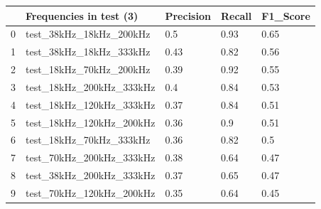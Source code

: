 \begin{longtable}{lllll}
\hline
\multicolumn{1}{|l|}{} & \multicolumn{1}{l|}{Frequencies in test (3)} & \multicolumn{1}{l|}{Precision} & \multicolumn{1}{l|}{Recall} & \multicolumn{1}{l|}{F1\_Score} \\ \hline
\endfirsthead
%
\endhead
%
\hline
\endfoot
%
\endlastfoot
%
0                      & test\_38kHz\_18kHz\_200kHz                  & 0.5                            & 0.93                        & 0.65                           \\
1                      & test\_38kHz\_18kHz\_333kHz                  & 0.43                           & 0.82                        & 0.56                           \\
2                      & test\_18kHz\_70kHz\_200kHz                  & 0.39                           & 0.92                        & 0.55                           \\
3                      & test\_18kHz\_200kHz\_333kHz                 & 0.4                            & 0.84                        & 0.53                           \\
4                      & test\_18kHz\_120kHz\_333kHz                 & 0.37                           & 0.84                        & 0.51                           \\
5                      & test\_18kHz\_120kHz\_200kHz                 & 0.36                           & 0.9                         & 0.51                           \\
6                      & test\_18kHz\_70kHz\_333kHz                  & 0.36                           & 0.82                        & 0.5                            \\
7                      & test\_70kHz\_200kHz\_333kHz                 & 0.38                           & 0.64                        & 0.47                           \\
8                      & test\_38kHz\_200kHz\_333kHz                 & 0.37                           & 0.65                        & 0.47                           \\
9                      & test\_70kHz\_120kHz\_200kHz                 & 0.35                           & 0.64                        & 0.45                           \\

\end{longtable}

